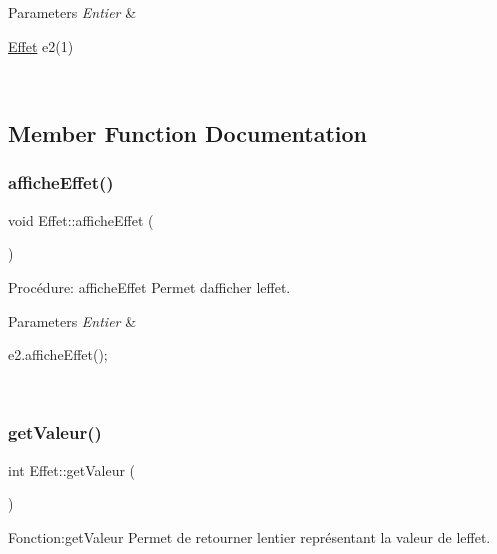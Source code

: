 \begin{DoxyParams}{Parameters}
{\em Entier} & 
\begin{DoxyCode}
\hyperlink{classEffet}{Effet} e2(1)
\end{DoxyCode}
 \\
\hline
\end{DoxyParams}


\subsection{Member Function Documentation}
\mbox{\label{classEffet_a038370be360fcb5e11f5d654e3506d42}} 
\subsubsection{\texorpdfstring{affiche\+Effet()}{afficheEffet()}}
{\footnotesize\ttfamily void Effet\+::affiche\+Effet (\begin{DoxyParamCaption}{ }\end{DoxyParamCaption})}



Procédure\+: affiche\+Effet Permet d\textquotesingle{}afficher l\textquotesingle{}effet. 


\begin{DoxyParams}{Parameters}
{\em Entier} & 
\begin{DoxyCode}
e2.afficheEffet();
\end{DoxyCode}
 \\
\hline
\end{DoxyParams}
\mbox{\label{classEffet_ab47e7ca4baed53d6955ad59a41d79538}} 
\subsubsection{\texorpdfstring{get\+Valeur()}{getValeur()}}
{\footnotesize\ttfamily int Effet\+::get\+Valeur (\begin{DoxyParamCaption}{ }\end{DoxyParamCaption})}



Fonction\+:get\+Valeur Permet de retourner l\textquotesingle{}entier représentant la valeur de l\textquotesingle{}effet. 

